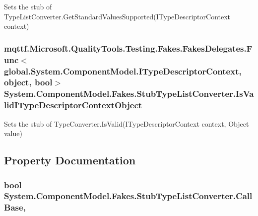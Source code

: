 Sets the stub of Type\-List\-Converter.\-Get\-Standard\-Values\-Supported(\-I\-Type\-Descriptor\-Context context)

\hypertarget{class_system_1_1_component_model_1_1_fakes_1_1_stub_type_list_converter_a504ff9d2bba6eb6005b4d8c559cbed29}{
\subsubsection[{Is\-Valid\-I\-Type\-Descriptor\-Context\-Object}]{\setlength{\rightskip}{0pt plus 5cm}mqttf.\-Microsoft.\-Quality\-Tools.\-Testing.\-Fakes.\-Fakes\-Delegates.\-Func$<$global.\-System.\-Component\-Model.\-I\-Type\-Descriptor\-Context, object, bool$>$ System.\-Component\-Model.\-Fakes.\-Stub\-Type\-List\-Converter.\-Is\-Valid\-I\-Type\-Descriptor\-Context\-Object}}\label{class_system_1_1_component_model_1_1_fakes_1_1_stub_type_list_converter_a504ff9d2bba6eb6005b4d8c559cbed29}


Sets the stub of Type\-Converter.\-Is\-Valid(\-I\-Type\-Descriptor\-Context context, Object value)



\subsection{Property Documentation}
\hypertarget{class_system_1_1_component_model_1_1_fakes_1_1_stub_type_list_converter_a1369b4424729c98a6f8596e5f6f23357}{
\subsubsection[{Call\-Base}]{\setlength{\rightskip}{0pt plus 5cm}bool System.\-Component\-Model.\-Fakes.\-Stub\-Type\-List\-Converter.\-Call\-Base\hspace{0.3cm}{\ttfamily [get]}, {\ttfamily [set]}}}\label{class_system_1_1_component_model_1_1_fakes_1_1_stub_type_list_converter_a1369b4424729c98a6f8596e5f6f23357}


